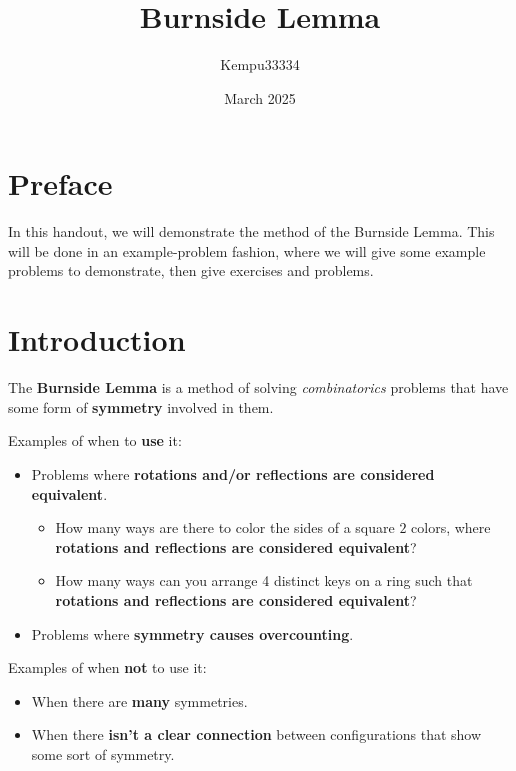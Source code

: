 \documentclass[11pt]{scrartcl}
\title{Burnside Lemma}
\author{\LARGE Kempu33334}
\date{\large March 2025}
\begin{document}
\maketitle

\section{Preface}
\large

In this handout, we will demonstrate the method of the Burnside Lemma. This will be done in an example-problem fashion, where we will give some example problems to demonstrate, then give exercises and problems. 

\section{Introduction}

The \color{blue} \textbf{Burnside Lemma} \color{black} is a method of solving \textit{combinatorics} problems that have some form of \textbf{symmetry} involved in them.

\begin{tcolorbox}[colback=orange!5!white,colframe=orange!75!black]
  Examples of when to \textbf{use} it:
  \begin{itemize}
  \item Problems where \color{blue} \textbf{rotations and/or reflections are considered equivalent}\color{black}.
  \begin{itemize}
      \item How many ways are there to color the sides of a square $2$ colors, where \textbf{rotations and reflections are considered equivalent}?
      \item How many ways can you arrange 4 distinct keys on a ring such that \textbf{rotations and reflections are considered equivalent}?
  \end{itemize}
  \item Problems where \color{blue} \textbf{symmetry causes overcounting}\color{black}.
  \end{itemize}
  Examples of when \textbf{not} to use it:
  \begin{itemize}
      \item When there are \textbf{many} symmetries.
      \item When there \textbf{isn't a clear connection} between configurations that show some sort of symmetry.
  \end{itemize}
\end{tcolorbox}
\end{document}
